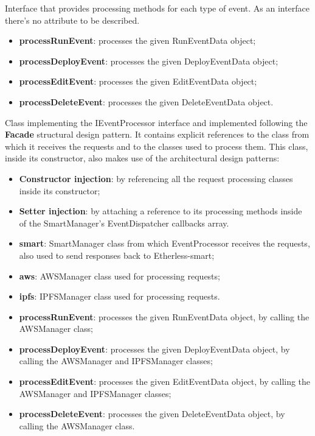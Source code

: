 	Interface that provides processing methods for each type of event.
	As an interface there's no attribute to be described.
	\begin{itemize}
		\item \textbf{processRunEvent}: processes the given RunEventData object;
		\item \textbf{processDeployEvent}: processes the given DeployEventData object;
		\item \textbf{processEditEvent}: processes the given EditEventData object;
		\item \textbf{processDeleteEvent}: processes the given DeleteEventData object.
	\end{itemize}
	Class implementing the IEventProcessor interface and implemented following the \textbf{Facade} structural design pattern. It contains explicit references to the class from which it receives the requests and to the classes used to process them. This class, inside its constructor, also makes use of the architectural design patterns:
	\begin{itemize}
		\item \textbf{Constructor injection}: by referencing all the request processing classes inside its constructor;
		\item \textbf{Setter injection}: by attaching a reference to its processing methods inside of the SmartManager's EventDispatcher callbacks array.
	\end{itemize}
	\begin{itemize}
		\item \textbf{smart}: SmartManager class from which EventProcessor receives the requests, also used to send responses back to Etherless-smart;
		\item \textbf{aws}: AWSManager class used for processing requests;
		\item \textbf{ipfs}: IPFSManager class used for processing requests.
	\end{itemize}
	\begin{itemize}
		\item \textbf{processRunEvent}: processes the given RunEventData object, by calling the AWSManager class;
		\item \textbf{processDeployEvent}: processes the given DeployEventData object, by calling the AWSManager and IPFSManager classes;
		\item \textbf{processEditEvent}: processes the given EditEventData object, by calling the AWSManager and IPFSManager classes;
		\item \textbf{processDeleteEvent}: processes the given DeleteEventData object, by calling the AWSManager class.
	\end{itemize}

